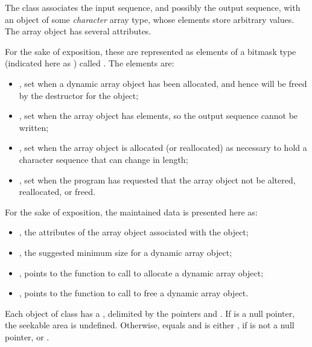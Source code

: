 \pnum
The class
associates the input sequence, and possibly the output sequence, with an object of some
\textit{character}
array type, whose elements store arbitrary values.
The array object has several attributes.

\pnum
\begin{note}
For the sake of exposition, these are represented as elements of a bitmask type
(indicated here as ) called .
The elements are:
\begin{itemize}
\item
{}, set when a dynamic array object has been
allocated, and hence will be freed by the destructor for the
 object;
\item
{}, set when the array object has
 elements, so the output sequence cannot be written;
\item
{}, set when the array object is allocated
(or reallocated)
as necessary to hold a character sequence that can change in length;
\item
{}, set when the program has requested that the
array object not be altered, reallocated, or freed.
\end{itemize}
\end{note}

\pnum
\begin{note}
For the sake of exposition, the maintained data is presented here as:
\begin{itemize}
\item
{}, the attributes of the array object
associated with the  object;
\item
{}, the suggested minimum size for a
dynamic array object;
\item
{}, points to the function
to call to allocate a dynamic array object;
\item
{}, points to the function to
call to free a dynamic array object.
\end{itemize}
\end{note}

\pnum
Each object of class
has a
,
delimited by the pointers  and .
If  is a null pointer, the seekable area is undefined.
Otherwise,  equals  and
 is either ,
if  is not a null pointer, or .

